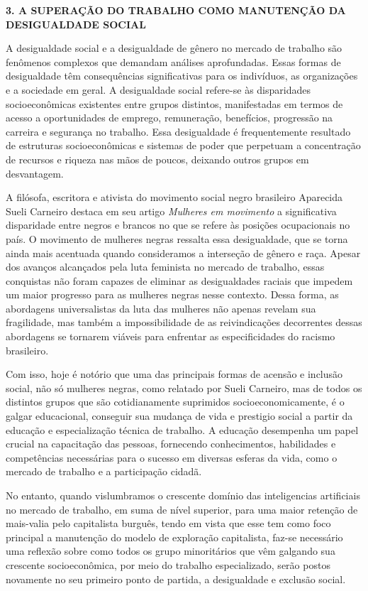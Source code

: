 \newpage
\begin{titulo}
    \raggedright\raggedright\textbf{3. A SUPERAÇÃO DO TRABALHO COMO MANUTENÇÃO DA DESIGUALDADE SOCIAL}
\end{titulo}
\par
A desigualdade social e a desigualdade de gênero no mercado de trabalho são fenômenos complexos que demandam análises aprofundadas. Essas formas de desigualdade têm consequências significativas para os indivíduos, as organizações e a sociedade em geral. A desigualdade social refere-se às disparidades socioeconômicas existentes entre grupos distintos, manifestadas em termos de acesso a oportunidades de emprego, remuneração, benefícios, progressão na carreira e segurança no trabalho. Essa desigualdade é frequentemente resultado de estruturas socioeconômicas e sistemas de poder que perpetuam a concentração de recursos e riqueza nas mãos de poucos, deixando outros grupos em desvantagem.
\par
A  filósofa, escritora e ativista do movimento social negro brasileiro Aparecida Sueli Carneiro destaca em seu artigo \textit{Mulheres em movimento} \cite{carneiro2003mulheres} a significativa disparidade entre negros e brancos no que se refere às posições ocupacionais no país. O movimento de mulheres negras ressalta essa desigualdade, que se torna ainda mais acentuada quando consideramos a interseção de gênero e raça. Apesar dos avanços alcançados pela luta feminista no mercado de trabalho, essas conquistas não foram capazes de eliminar as desigualdades raciais que impedem um maior progresso para as mulheres negras nesse contexto. Dessa forma, as abordagens universalistas da luta das mulheres não apenas revelam sua fragilidade, mas também a impossibilidade de as reivindicações decorrentes dessas abordagens se tornarem viáveis para enfrentar as especificidades do racismo brasileiro.
\par
Com isso, hoje é notório que uma das principais formas de acensão e inclusão social, não só mulheres negras, como relatado por Sueli Carneiro, mas de todos os distintos grupos que são cotidianamente suprimidos socioeconomicamente, é o galgar educacional, conseguir sua mudança de vida e prestigio social a partir da educação e especialização técnica de trabalho. A educação desempenha um papel crucial na capacitação das pessoas, fornecendo conhecimentos, habilidades e competências necessárias para o sucesso em diversas esferas da vida, como o mercado de trabalho e a participação cidadã.
\par
No entanto, quando vislumbramos o crescente domínio das inteligencias artificiais no mercado de trabalho, em suma de nível superior, para uma maior retenção de mais-valia pelo capitalista burguês, tendo em vista que esse tem como foco principal a manutenção do modelo de exploração capitalista, faz-se necessário uma reflexão sobre como todos os grupo minoritários que vêm galgando sua crescente socioeconômica, por meio do trabalho especializado, serão postos novamente no seu primeiro ponto de partida, a desigualdade e exclusão social.

